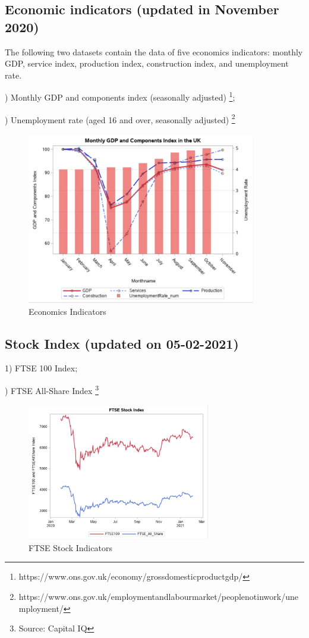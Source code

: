 \documentclass[12pt, a4paper]{report}
\begin{document}
\subsection{Economic indicators (updated in November 2020)} 
The following two datasets contain the data of five economics indicators: monthly GDP, service index, 
production index, construction index, and unemployment rate.\par
{}) Monthly GDP and components index (seasonally adjusted)
\footnote[4]{https://www.ons.gov.uk/economy/grossdomesticproductgdp/};\par
{}) Unemployment rate (aged 16 and over, seasonally adjusted)
\footnote[5]{https://www.ons.gov.uk/employmentandlabourmarket/peoplenotinwork/unemployment/}
\begin{figure}[H] 
\centering 
\includegraphics[width=10cm]{economics_indicators.jpg} 
\caption{Economics Indicators}
\end{figure}
    
\subsection{Stock Index (updated on 05-02-2021)}
1) FTSE 100 Index;\par
{}) FTSE All-Share Index
\footnote[6]{Source: Capital IQ}
\begin{figure}[H] 
\centering 
\includegraphics[width=8cm]{ftse.jpg} 
\caption{FTSE Stock Indicators}
\end{figure}
        
\end{document}
